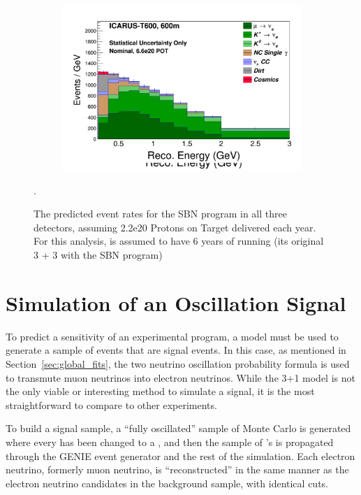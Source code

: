 \begin{figure}[]
\begin{subfigure}[]{0.49\textwidth}
    \end{subfigure}
    \\
    \begin{subfigure}[]{0.49\textwidth}
        \centering
        \includegraphics[width=\textwidth]{sbn_figures/nominal_nue_appearance_nosig_ICARUS-T600_600m}
    \end{subfigure}
    \caption[SBN Event Rates]{The predicted event rates for the SBN program in all three detectors, assuming 2.2e20 Protons on Target delivered each year.  For this analysis, \uboone is assumed to have 6 years of running (its original 3 + 3 with the SBN program)}.
   \label{fig:sbn_event_rates_no_signal}
\end{figure}

\section{Simulation of an Oscillation Signal}

To predict a sensitivity of an experimental program, a model must be used to generate a sample of events that are signal events.  In this case, as mentioned in Section~\ref{sec:global_fits}, the two neutrino oscillation probability formula is used to transmute muon neutrinos into electron neutrinos.  While the 3+1 model is not the only viable or interesting method to simulate a signal, it is the most straightforward to compare to other experiments.  

To build a signal sample, a ``fully oscillated'' sample of Monte Carlo is generated where every \numu has been changed to a \nue, and then the sample of \nue's is propagated through the GENIE event generator and the rest of the simulation.  Each electron neutrino, formerly muon neutrino, is ``reconstructed'' in the same manner as the electron neutrino candidates in the background sample, with identical cuts.  

